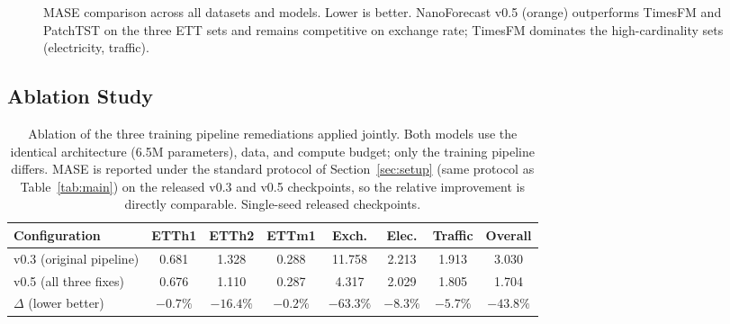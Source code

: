 \documentclass[11pt]{article}
\begin{document}
\begin{figure}[t]
\centering
{}
\caption{MASE comparison across all datasets and models. Lower is better. NanoForecast v0.5 (orange) outperforms TimesFM and PatchTST on the three ETT sets and remains competitive on exchange rate; TimesFM dominates the high-cardinality sets (electricity, traffic).}
\label{fig:benchmark}
\end{figure}

\subsection{Ablation Study}
\label{sec:ablation}

\begin{table}[h]
\centering
\caption{Ablation of the three training pipeline remediations applied jointly. Both models use the identical architecture (6.5M parameters), data, and compute budget; only the training pipeline differs. MASE is reported under the standard protocol of Section~\ref{sec:setup} (same protocol as Table~\ref{tab:main}) on the released v0.3 and v0.5 checkpoints, so the relative improvement is directly comparable. Single-seed released checkpoints.}
\label{tab:ablation}
\small
\begin{tabular}{lccccccc}
\toprule
Configuration & ETTh1 & ETTh2 & ETTm1 & Exch. & Elec. & Traffic & Overall \\
\midrule
v0.3 (original pipeline) & 0.681 & 1.328 & 0.288 & 11.758 & 2.213 & 1.913 & 3.030 \\
v0.5 (all three fixes) & 0.676 & 1.110 & 0.287 & 4.317 & 2.029 & 1.805 & 1.704 \\
$\Delta$ (lower better) & $-0.7\%$ & $-16.4\%$ & $-0.2\%$ & $-63.3\%$ & $-8.3\%$ & $-5.7\%$ & $-43.8\%$ \\
\bottomrule
\end{tabular}
\end{table}
\end{document}
